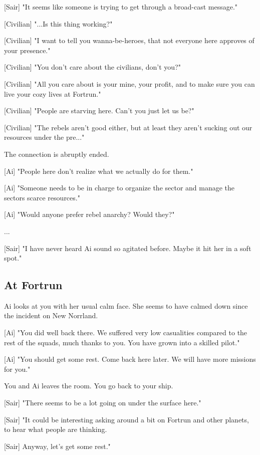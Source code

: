 \documentclass[a4paper,12pt]{article}
\begin{document}
[Sair] "It seems like someone is trying to get through a broad-cast message."

[Civilian] "...Is this thing working?" 

[Civilian] "I want to tell you wanna-be-heroes, that not everyone here
approves of your presence." 

[Civilian] "You don't care about the civilians, don't you?" 

[Civilian] "All you care about is your mine, your profit, and to make sure you can live your cozy lives at Fortrun."

[Civilian] "People are starving here. Can't you just let us be?"

[Civilian] "The rebels aren't good either, but at least they aren't sucking out our resources under the pre..." 

The connection is abruptly ended.

[Ai] "People here don't realize what we actually do for them."

[Ai] "Someone needs to be in charge to organize the sector and manage the sectors scarce resources."

[Ai] "Would anyone prefer rebel anarchy? Would they?"

...

[Sair] "I have never heard Ai sound so agitated before. Maybe it hit her in a soft spot."

\subsection{At Fortrun}

Ai looks at you with her usual calm face. She seems to have calmed down since the incident on New Norrland.

[Ai] "You did well back there. We suffered very low casualities compared
to the rest of the squads, much thanks to you. You have grown into a skilled pilot." 

[Ai] "You should get some rest. Come back here later. We will have more missions for you."

You and Ai leaves the room. You go back to your ship.

[Sair] "There seems to be a lot going on under the surface here." 

[Sair] "It could be interesting asking around a bit on Fortrun and other planets, to hear what people are thinking. 

[Sair] Anyway, let's get some rest."
\end{document}
